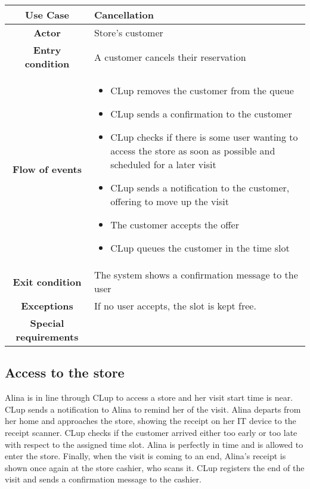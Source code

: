 \documentclass[../../main.tex]{subfiles}
\begin{document}
    \begin{table}[H]
      \centering
        \begin{tabular}{c m{}}
        \hline
        \textbf{Use Case} & Cancellation\\ \hline
        \textbf{Actor} & Store's customer\\ \hline
        \textbf{Entry condition} & A customer cancels their reservation\\  \hline
        \textbf{Flow of events} & \begin{itemize}
                                    \item CLup removes the customer from the queue
                                    \item CLup sends a confirmation to the customer
                                    \item CLup checks if there is some user wanting to access the store as soon as possible and scheduled for a later visit
                                    \item CLup sends a notification to the customer, offering to move up the visit
                                    \item The customer accepts the offer
                                    \item CLup queues the customer in the time slot
                                  \end{itemize}\\ \hline
        \textbf{Exit condition} & The system shows a confirmation message to the user \\ \hline
        \textbf{Exceptions} & If no user accepts, the slot is kept free. \\ \hline
        \textbf{Special requirements} &\\ \hline
        \end{tabular}
    \end{table}

    \subsection*{Access to the store}

    Alina is in line through CLup to access a store and her visit start time is near. 
    CLup sends a notification to Alina to remind her of the visit. 
    Alina departs from her home and approaches the store, showing the receipt on her IT device to the receipt scanner. 
    CLup checks if the customer arrived either too early or too late with respect to the assigned time slot. 
    Alina is perfectly in time and is allowed to enter the store. Finally, when the visit is coming to an end, 
    Alina's receipt is shown once again at the store cashier, who scans it. 
    CLup registers the end of the visit and sends a confirmation message to the cashier.
\end{document}
